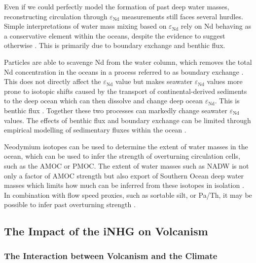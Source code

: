 Even if we could perfectly model the formation of past deep water masses, reconstructing circulation through $\varepsilon_\text{Nd}$ measurements still faces several hurdles. Simple interpretations of water mass mixing based on $\varepsilon_\text{Nd}$ rely on Nd behaving as a conservative element within the oceans, despite the evidence to suggest otherwise \citep{lacanNeodymiumIsotopesNew2005, jeandelOverviewMechanismsThat2016, jeandelIsotopicNdCompositions2007, haleyImpactBenthicProcesses2017}. This is primarily due to boundary exchange and benthic flux.

Particles are able to scavenge Nd from the water column, which removes the total Nd concentration in the oceans in a process referred to as boundary exchange \citep{jeandelOverviewMechanismsThat2016}. This does not directly affect the $\varepsilon_\text{Nd}$ value but makes seawater $\varepsilon_\text{Nd}$ values more prone to isotopic shifts caused by the transport of continental-derived sediments to the deep ocean which can then dissolve and change deep ocean $\varepsilon_\text{Nd}$. This is benthic flux \citep{duNeodymiumIsotopesAuthigenic2016, abbottBottomsSedimentaryControl2015}. Together these two processes can markedly change seawater $\varepsilon_\text{Nd}$ values. The effects of benthic flux and boundary exchange can be limited through empirical modelling of sedimentary fluxes within the ocean \citep{haleyImpactBenthicProcesses2017, poppelmeierNeodymiumIsotopesPaleowater2022}.

Neodymium isotopes can be used to determine the extent of water masses in the ocean, which can be used to infer the strength of overturning circulation cells, such as the AMOC or PMOC. The extent of water masses such as NADW is not only a factor of AMOC strength but also export of Southern Ocean deep water masses which limits how much can be inferred from these isotopes in isolation \citep{langIncursionsSouthernsourcedWater2016}. In combination with flow speed proxies, such as sortable silt, or Pa/Th, it may be possible to infer past overturning strength \citep{jonkersDeepCirculationChanges2015}.

\subsection{The Impact of the iNHG on Volcanism}

\subsubsection{The Interaction between Volcanism and the Climate}

